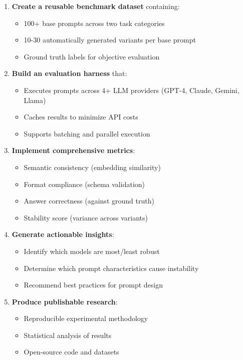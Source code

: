 \documentclass[11pt,a4paper]{article}
\begin{document}
\begin{enumerate}[leftmargin=*]
    \item \textbf{Create a reusable benchmark dataset} containing:
    \begin{itemize}
        \item 100+ base prompts across two task categories
        \item 10-30 automatically generated variants per base prompt
        \item Ground truth labels for objective evaluation
    \end{itemize}
    
    \item \textbf{Build an evaluation harness} that:
    \begin{itemize}
        \item Executes prompts across 4+ LLM providers (GPT-4, Claude, Gemini, Llama)
        \item Caches results to minimize API costs
        \item Supports batching and parallel execution
    \end{itemize}
    
    \item \textbf{Implement comprehensive metrics}:
    \begin{itemize}
        \item Semantic consistency (embedding similarity)
        \item Format compliance (schema validation)
        \item Answer correctness (against ground truth)
        \item Stability score (variance across variants)
    \end{itemize}
    
    \item \textbf{Generate actionable insights}:
    \begin{itemize}
        \item Identify which models are most/least robust
        \item Determine which prompt characteristics cause instability
        \item Recommend best practices for prompt design
    \end{itemize}
    
    \item \textbf{Produce publishable research}:
    \begin{itemize}
        \item Reproducible experimental methodology
        \item Statistical analysis of results
        \item Open-source code and datasets
    \end{itemize}
\end{enumerate}
\end{document}
